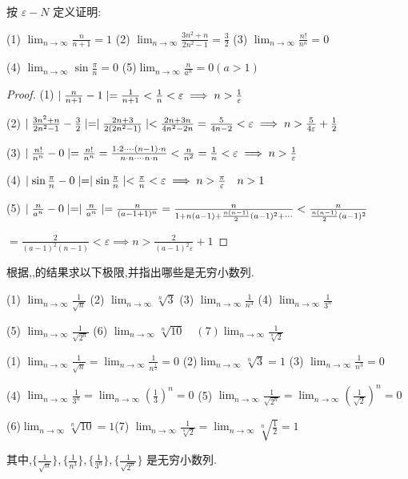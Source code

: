 \begin{practice}
    按 $\varepsilon-N$ 定义证明:

    (1) $\lim_{n\to\infty} \frac{n}{n+1}=1$ \quad (2) $\lim_{n\to\infty} \frac{3n^2+n}{2n^2-1}=\frac{3}{2}$ \quad (3) $\lim_{n\to\infty} \frac{n!}{n^n}=0$

    (4) $\lim_{n\to\infty} \sin \frac{\pi}{n}=0$ \quad (5)$\lim_{n\to\infty} \frac{n}{a^n}=0(a>1)$
\end{practice}

\begin{proof}
    (1) $\mid \frac{n}{n+1}-1 \mid=\frac{1}{n+1}<\frac{1}{n}<\varepsilon \implies n>\frac{1}{\varepsilon}$

    (2) $\mid \frac{3n^2+n}{2n^2-1}-\frac{3}{2} \mid=\mid \frac{2n+3}{2(2n^2-1)} \mid<\frac{2n+3n}{4n^2-2n}=\frac{5}{4n-2}<\varepsilon \implies n>\frac{5}{4\varepsilon}+\frac{1}{2}$

    (3) $\mid \frac{n!}{n^n}-0 \mid=\frac{n!}{n^n}=\frac{1\cdot 2\cdot \cdots (n-1)
    \cdot n }{n\cdot n\cdot \cdots n
    \cdot n}<\frac{n}{n^2}=\frac{1}{n}<\varepsilon \implies n>\frac{1}{\varepsilon}$

    (4) $\mid \sin \frac{\pi}{n}-0 \mid=\mid \sin \frac{\pi}{n} \mid<\frac{\pi}{n}<\varepsilon \implies n>\frac{\pi}{\varepsilon} \quad n>1$

    (5) $\mid \frac{n}{a^n}-0 \mid=\mid \frac{n}{a^n} \mid=\frac{n}{(a-1+1)^n}=\frac{n}{1+n(a-1)+\frac{n(n-1)}{2}(a-1)^2+\cdots}<\frac{n}{\frac{n(n-1)}{2}(a-1)^2}
    $
    
    $=\frac{2}{(a-1)^2(n-1)}<\varepsilon \implies n>\frac{2}{(a-1)^2\varepsilon}+1$
\end{proof}

\begin{practice}
    根据,,的结果求以下极限,并指出哪些是无穷小数列.

    (1) $\lim_{n\to\infty} \frac{1}{\sqrt{n}}$ \quad (2) $\lim_{n\to\infty} \sqrt[n]{3}$ \quad (3) $\lim_{n\to\infty} \frac{1}{n^3}$ \quad (4) $\lim_{n\to\infty} \frac{1}{3^n}$ 

    (5) $\lim_{n\to\infty} \frac{1}{\sqrt{2^n}}$ \quad (6) $\lim_{n\to\infty} \sqrt[n]{10} \quad (7) \lim_{n\to\infty}\frac{1}{\sqrt[n]{2}}$
\end{practice}

\begin{solve}
    (1) $\lim_{n\to\infty} \frac{1}{\sqrt{n}}=\lim_{n\to\infty} \frac{1}{n^{\frac{1}{2}}}=0$ \quad (2)$\lim_{n\to\infty} \sqrt[n]{3}=1$ \quad (3) $\lim_{n\to\infty} \frac{1}{n^3}=0$

    (4) $\lim_{n\to\infty} \frac{1}{3^n}=\lim_{n\to\infty}(\frac{1}{3})^n=0$ \quad (5)  $\lim_{n\to\infty} \frac{1}{\sqrt{2^n}}=\lim_{n\to\infty} (\frac{1}{\sqrt{2}})^n=0$

    (6)$\lim_{n\to\infty} \sqrt[n]{10}=1$\quad (7) $\lim_{n\to\infty}\frac{1}{\sqrt[n]{2}}=\lim_{n\to\infty} \sqrt[n]{\frac{1}{2}}=1$

    其中,$\{\frac{1}{\sqrt{n}}\},\{\frac{1}{n^3}\},\{\frac{1}{3^n}\},\{\frac{1}{\sqrt{2^n}}\}$ 是无穷小数列.
\end{solve}

